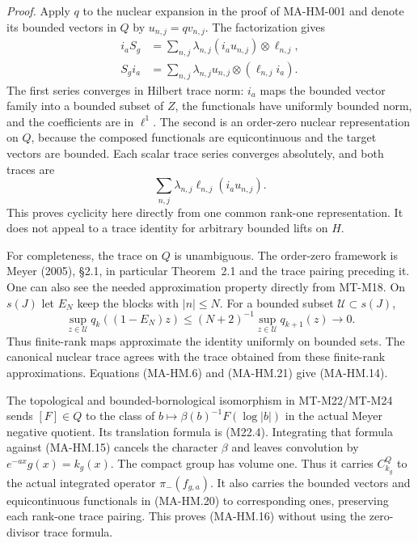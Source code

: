 \emph{Proof.}
Apply $q$ to the nuclear expansion in the proof of
MA-HM-001 and denote its bounded vectors in $Q$ by
$u_{n,j}=qv_{n,j}$.  The factorization gives
\[
 \begin{aligned}
 i_aS_g&=\sum_{n,j}\lambda_{n,j}
                     (i_au_{n,j})\otimes\ell_{n,j},\\
 S_gi_a&=\sum_{n,j}\lambda_{n,j}
                      u_{n,j}\otimes(\ell_{n,j}i_a).
 \end{aligned}
 \tag{MA-HM.20}
\]
The first series converges in Hilbert trace norm: $i_a$
maps the bounded vector family into a bounded subset of
$Z$, the functionals have uniformly bounded norm, and the
coefficients are in $\ell^1$.  The second is an order-zero
nuclear representation on $Q$, because the composed
functionals are equicontinuous and the target vectors are
bounded.  Each scalar trace series converges absolutely,
and both traces are
\[
          \sum_{n,j}\lambda_{n,j}
                            \ell_{n,j}(i_au_{n,j}).
 \tag{MA-HM.21}
\]
This proves cyclicity here directly from one common
rank-one representation.  It does not appeal to a trace
identity for arbitrary bounded lifts on $H$.

For completeness, the trace on $Q$ is unambiguous.
The order-zero framework is Meyer (2005), \S2.1, in
particular Theorem~2.1 and the trace pairing preceding it.
One can also see the needed approximation property
directly from MT-M18.  On $s(J)$ let $E_N$ keep the
blocks with $|n|\le N$.  For a bounded subset
$\mathcal U\subset s(J)$,
\[
    \sup_{z\in\mathcal U}q_k((1-E_N)z)
       \le (N+2)^{-1}\sup_{z\in\mathcal U}q_{k+1}(z)
                        \longrightarrow0.
 \tag{MA-HM.22}
\]
Thus finite-rank maps approximate the identity uniformly
on bounded sets.  The canonical nuclear trace agrees
with the trace obtained from these finite-rank
approximations.  Equations (MA-HM.6) and (MA-HM.21)
give (MA-HM.14).

The topological and bounded-bornological isomorphism in
MT-M22/MT-M24 sends $[F]\in Q$ to the class of
$b\mapsto\beta(b)^{-1}F(\log|b|)$ in the actual Meyer
negative quotient.  Its translation formula is
(M22.4).  Integrating that formula against (MA-HM.15)
cancels the character $\beta$ and leaves convolution by
$e^{-ax}g(x)=k_g(x)$.  The compact group has volume one.
Thus it carries $C_{k_g}^Q$ to the actual integrated
operator $\pi_-(f_{g,a})$.
It also carries the bounded vectors and equicontinuous
functionals in (MA-HM.20) to corresponding ones, preserving
each rank-one trace pairing.  This proves (MA-HM.16)
without using the zero-divisor trace formula.

